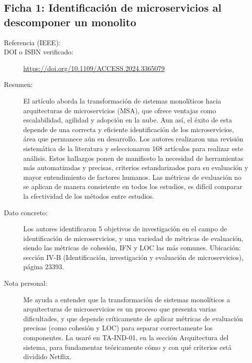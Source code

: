 \subsection{Ficha 1: Identificación de microservicios al descomponer un monolito}
\begin{description}
  \item[Referencia (IEEE):] 
  \item[DOI o ISBN verificado:] \url{https://doi.org/10.1109/ACCESS.2024.3365079}
  \item[Resumen:] El artículo aborda la transformación de sistemas monolíticos hacia arquitecturas de microservicios (MSA), que ofrece ventajas como escalabilidad, agilidad y adopción en la nube. Aun así, el éxito de esta depende de una correcta y eficiente identificación de los microservicios, área que permanece aún en desarrollo. Los autores realizaron una revisión sistemática de la literatura y seleccionaron 168 artículos para realizar este análisis. Estos hallazgos ponen de manifiesto la necesidad de herramientas más automatizadas y precisas, criterios estandarizados para su evaluación y mayor entendimiento de factores humanos.
Las métricas de evaluación no se aplican de manera consistente en todos los estudios, es difícil comparar la efectividad de los métodos entre estudios.
  \item[Dato concreto:] Los autores identificaron 5 objetivos de investigación en el campo de identificación de microservicios, y una variedad de métricas de evaluación, siendo las métricas de cohesión, IFN y LOC las más comunes. Ubicación: sección IV-B (Identificación, investigación y evaluación de microservicios), página 23393. 
  \item[Nota personal:] Me ayuda a entender que la transformación de sistemas monolíticos a arquitecturas de microservicios es un proceso que presenta varias dificultades, y que depende críticamente de aplicar métricas de evaluación precisas (como cohesión y LOC) para separar correctamente los componentes. La usaré en TA-IND-01, en la sección Arquitectura del sistema, para fundamentar teóricamente cómo y con qué criterios está dividido Netflix.
\end{description}


